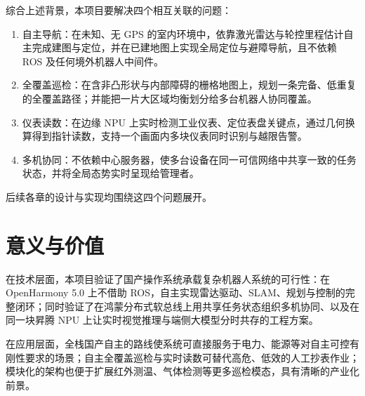综合上述背景，本项目要解决四个相互关联的问题：

\begin{enumerate}
\item 自主导航：在未知、无 GPS 的室内环境中，依靠激光雷达与轮控里程估计自主完成建图与定位，并在已建地图上实现全局定位与避障导航，且不依赖 ROS 及任何境外机器人中间件。
\item 全覆盖巡检：在含非凸形状与内部障碍的栅格地图上，规划一条完备、低重复的全覆盖路径；并能把一片大区域均衡划分给多台机器人协同覆盖。
\item 仪表读数：在边缘 NPU 上实时检测工业仪表、定位表盘关键点，通过几何换算得到指针读数，支持一个画面内多块仪表同时识别与越限告警。
\item 多机协同：不依赖中心服务器，使多台设备在同一可信网络中共享一致的任务状态，并将全局态势实时呈现给管理者。
\end{enumerate}

后续各章的设计与实现均围绕这四个问题展开。

\section{意义与价值}
\label{sec:significance}

在技术层面，本项目验证了国产操作系统承载复杂机器人系统的可行性：在 OpenHarmony 5.0 上不借助 ROS，自主实现雷达驱动、SLAM、规划与控制的完整闭环；同时验证了在鸿蒙分布式软总线上用共享任务状态组织多机协同、以及在同一块昇腾 NPU 上让实时视觉推理与端侧大模型分时共存的工程方案。

在应用层面，全栈国产自主的路线使系统可直接服务于电力、能源等对自主可控有刚性要求的场景；自主全覆盖巡检与实时读数可替代高危、低效的人工抄表作业；模块化的架构也便于扩展红外测温、气体检测等更多巡检模态，具有清晰的产业化前景。
